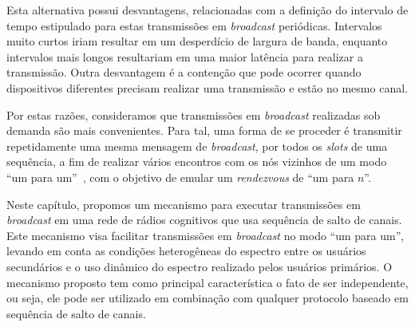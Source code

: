 Esta alternativa possui desvantagens, relacionadas com a definição do intervalo de tempo estipulado para estas transmissões em {\it broadcast} periódicas. Intervalos muito curtos iriam resultar em um desperdício de largura de banda, enquanto intervalos mais longos resultariam em uma maior latência para realizar a transmissão. Outra desvantagem é a contenção que pode ocorrer quando dispositivos diferentes precisam realizar uma transmissão e estão no mesmo canal. %


Por estas razões, consideramos que transmissões em {\it broadcast} realizadas sob demanda são mais convenientes. Para tal, uma forma de se proceder é transmitir repetidamente uma mesma mensagem de {\it broadcast}, por todos os {\it slots} de uma sequência, a fim de realizar vários encontros com os nós vizinhos de um modo ``um para um''~\cite {ssch}, com o objetivo de emular um {\it rendezvous} de ``um para $n$''.

Neste capítulo, propomos um mecanismo para executar transmissões em {\it broadcast} em uma rede de rádios cognitivos que usa sequência de salto de canais. Este mecanismo visa facilitar transmissões em {\it broadcast} no modo ``um para um'', levando em conta as condições heterogêneas do espectro entre os usuários secundários e o uso dinâmico do espectro realizado pelos usuários primários. O mecanismo proposto tem como principal característica o fato de ser independente, ou seja, ele pode ser utilizado em combinação com qualquer protocolo baseado em sequência de salto de canais. 


